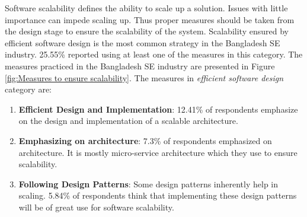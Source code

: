  Software scalability defines the ability to scale up a solution. Issues with little importance can impede scaling up. Thus proper measures should be taken from the design stage to ensure the scalability of the system. Scalability ensured by efficient software design is the most common strategy in the Bangladesh SE industry. 25.55\% reported using at least one of the measures in this category. The measures practiced in the Bangladesh SE industry are presented in Figure \ref{fig:Measures to ensure scalability}. The measures in \emph{efficient software design} category are:
 \begin{enumerate}[label=(\alph*)]
 
     \item \textbf{Efficient Design and Implementation}: 12.41\% of respondents emphasize on the design and implementation of a scalable architecture. 
    
     \item \textbf{Emphasizing on architecture}: 7.3\% of respondents emphasized on architecture. It is mostly micro-service architecture which they use to ensure scalability.

    
    \item \textbf{Following Design Patterns}: Some design patterns inherently help in scaling. 5.84\% of respondents think that implementing these design patterns will be of great use for software scalability.
 
 \end{enumerate}
 
